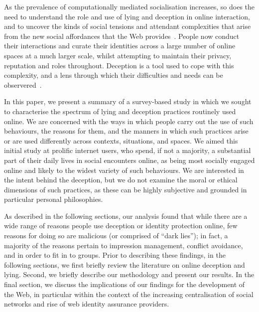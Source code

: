 \documentclass{sig-alternate}
\begin{document}
As the prevalence of computationally mediated socialisation increases, so does the need to understand the role and use of lying and deception in online interaction, and to uncover the kinds of social tensions and attendant complexities that arise from the new social affordances that the Web provides~\cite{hancock2004deception}.
People now conduct their interactions and curate their identities across a large number of online spaces at a much larger scale, whilst attempting to maintain their privacy, reputation and roles throughout. Deception is a tool used to cope with this complexity, and a lens through which their difficulties and needs can be observered~\cite{hancock2007digital, Burgoon:2003:TDM:820748.821362}.  

In this paper, we present a summary of a survey-based study in which we sought to characterise the spectrum of lying and deception practices routinely used online. We are concerned with the ways in which people carry out the use of such behaviours, the reasons for them, and the manners in which such practices arise or are used differently across contexts, situations, and spaces. We aimed this initial study at prolific internet users, who spend, if not a majority, a substantial part of their daily lives in social encounters online, as being most socially engaged online and likely to the widest variety of such behaviours. We are interested in the intent behind the deception, but we do not examine the moral or ethical dimensions of such practices, as these can be highly subjective and grounded in particular personal philosophies. 

As described in the following sections, our analysis found that while there are a wide range of reasons people use deception or identity protection online, few reasons for doing so are malicious (or comprised of ``dark lies''); in fact, a majority of the reasons pertain to impression management, conflict avoidance, and in order to fit in to groups.  Prior to describing these findings, in the following sections, we first briefly review the literature on online deception and lying. Second, we briefly describe our methodology and present our results. In the final section, we discuss the implications of our findings  for the development of the Web, in particular within the context of the increasing centralisation of social networks and rise of web identity assurance providers.



\end{document}
